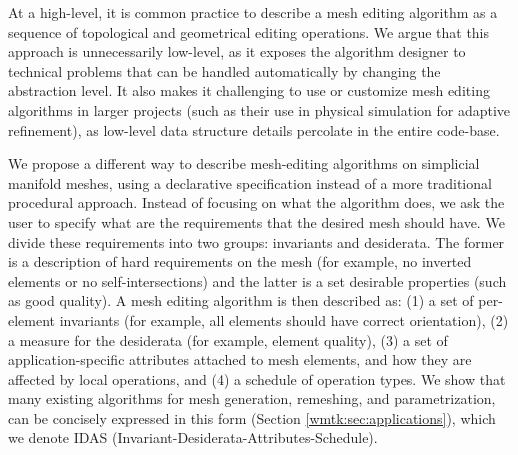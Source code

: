At a high-level, it is common practice to describe a mesh editing algorithm as a sequence of topological and geometrical editing operations. We argue that this approach is unnecessarily low-level, as it exposes the algorithm designer to technical problems that can be handled automatically by changing the abstraction level. It also makes it challenging to use or customize mesh editing algorithms in larger projects (such as their use in physical simulation for adaptive refinement), as low-level data structure details percolate in the entire code-base. 

We propose a different way to describe mesh-editing algorithms on simplicial manifold meshes, using a declarative specification instead of a more traditional procedural approach. Instead of focusing on what the algorithm does, we ask the user to specify what are the requirements that the desired mesh should have. We divide these requirements into two groups: invariants and desiderata. The former is a description of hard requirements on the mesh (for example, no inverted elements or no self-intersections) and the latter is a set desirable properties (such as good quality). A mesh editing algorithm is then described as: (1) a set of per-element invariants (for example, all elements should have correct orientation), (2) a measure for the desiderata (for example, element quality), (3) a set of application-specific attributes attached to mesh elements, and how they are affected by local operations, and (4) a schedule of operation types. We show that many existing algorithms for mesh generation, remeshing, and parametrization, can be concisely expressed in this form (Section \ref{wmtk:sec:applications}), which we denote IDAS (Invariant-Desiderata-Attributes-Schedule).

